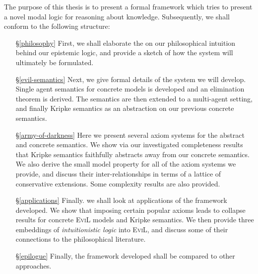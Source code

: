 \documentclass[11pt,titlepage]{report}
\numberwithin{equation}{subsection}
\begin{document}
The purpose
of this thesis is to present a formal framework which tries to present
a novel modal logic for reasoning about knowledge.
Subsequently, we shall conform to the following structure:
\begin{itemize}
  \item[\S\ref{philosophy}] First, we shall elaborate the
    on our philosophical intuition behind our epistemic logic, and
    provide a sketch of how the system will ultimately be formulated.
    \item[\S\ref{evil-semantics}] Next, we give formal details of the
      system we will develop.  Single agent semantics for concrete
      models is developed and an elimination theorem is derived.  
     The semantics are then extended to a multi-agent setting, 
      and finally Kripke semantics
      as an abstraction on our previous concrete semantics.
    \item[\S\ref{army-of-darkness}]Here we present several
      axiom systems for the abstract and concrete semantics.  We show
      via our investigated completeness results that Kripke semantics
      faithfully abstracts away from our concrete semantics.  We also
      derive the small model property for all of the axiom systems
      we provide, and discuss their inter-relationships in terms of a lattice
      of conservative extensions.  Some complexity results are also provided. 
  \item[\S\ref{applications}]  Finally. we shall look at
    applications of the framework developed.  We show that imposing
    certain popular axioms leads to collapse results for concrete
    \textsc{EviL} models and Kripke semantics. We then provide
    three embeddings of \emph{intuitionistic logic} into
    \textsc{EviL}, and discuss some of their connections 
    to the philosophical literature.
  \item[\S\ref{epilogue}]  Finally, the framework developed shall be
    compared to other approaches.
\end{itemize}
\end{document}

